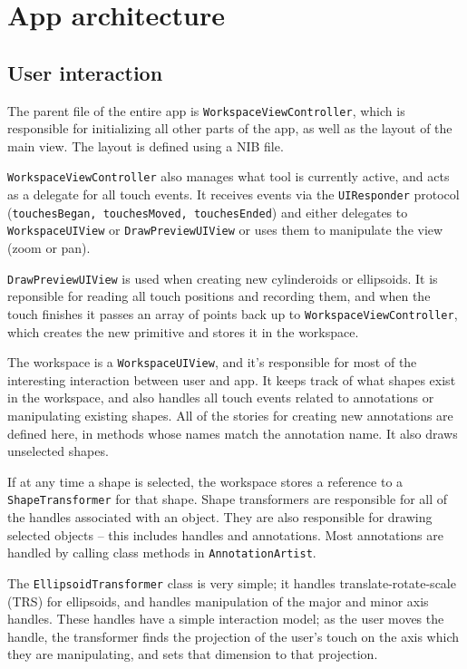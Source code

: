 \section{App architecture}
\subsection{User interaction}
The parent file of the entire app is \verb#WorkspaceViewController#, which is
responsible for initializing all other parts of the app, as well as the layout
of the main view. The layout is defined using a NIB file.

\verb#WorkspaceViewController# also manages what tool is currently active, and
acts as a delegate for all touch events. It receives events via the
\verb#UIResponder# protocol (\verb#touchesBegan, touchesMoved, touchesEnded#)
and either delegates to \verb#WorkspaceUIView# or \verb#DrawPreviewUIView# or
uses them to manipulate the view (zoom or pan).

\verb#DrawPreviewUIView# is used when creating new cylinderoids or ellipsoids.
It is reponsible for reading all touch positions and recording them, and when
the touch finishes it passes an array of points back up to
\verb#WorkspaceViewController#, which creates the new primitive and stores it in
the workspace.

The workspace is a \verb#WorkspaceUIView#, and it's responsible for most of the
interesting interaction between user and app. It keeps track of what shapes
exist in the workspace, and also handles all touch events related to annotations
or manipulating existing shapes. All of the stories for creating new annotations
are defined here, in methods whose names match the annotation name. It also
draws unselected shapes.

If at any time a shape is selected, the workspace stores a reference to a
\verb#ShapeTransformer# for that shape. Shape transformers are responsible for
all of the handles associated with an object. They are also responsible for
drawing selected objects -- this includes handles and annotations. Most
annotations are handled by calling class methods in \verb#AnnotationArtist#.

The \verb#EllipsoidTransformer# class is very simple; it handles
translate-rotate-scale (TRS) for ellipsoids, and handles manipulation of the
major and minor axis handles. These handles have a simple interaction model; as
the user moves the handle, the transformer finds the projection of the user's
touch on the axis which they are manipulating, and sets that dimension to that
projection.

